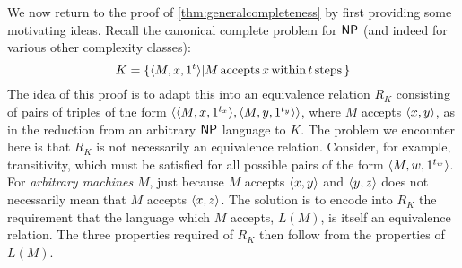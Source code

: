 We now return to the proof of \autoref{thm:generalcompleteness} by first providing some motivating ideas.
Recall the canonical complete problem for ${\mathsf{NP}}$ (and indeed for various other complexity classes):
\begin{displaymath}
  K = \{\langle M,x,1^t\rangle|M\,\text{accepts}\, x \,\text{within}\, t \,\text{steps}\,\}
\end{displaymath}
The idea of this proof is to adapt this into an equivalence relation $R_K$ consisting of pairs of triples of the form $\langle\langle M,x,1^{t_x}\rangle,\langle M,y,1^{t_y}\rangle\rangle$, where $M$ accepts $\langle x,y\rangle$, as in the reduction from an arbitrary ${\mathsf{NP}}$ language to $K$.
The problem we encounter here is that $R_K$ is not necessarily an equivalence relation.
Consider, for example, transitivity, which must be satisfied for all possible pairs of the form $\langle M,w,1^{t_w}\rangle$.
For \emph{arbitrary machines} $M$, just because $M$ accepts $\langle x,y\rangle$ and $\langle y,z\rangle$ does not necessarily mean that $M$ accepts $\langle x,z\rangle$.
The solution is to encode into $R_K$ the requirement that the language which $M$ accepts, $L(M)$, is itself an equivalence relation.
The three properties required of $R_K$ then follow from the properties of $L(M)$.

